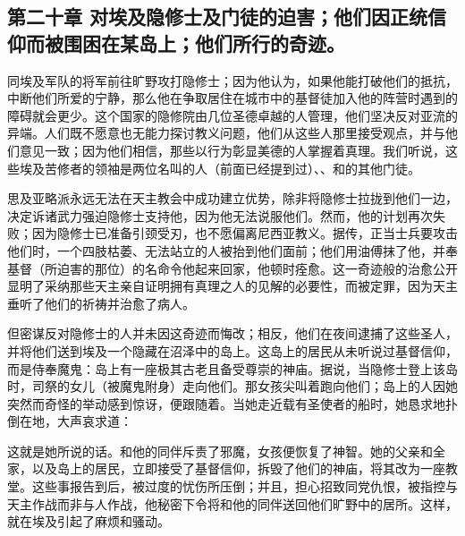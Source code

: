 \subsection{第二十章 对埃及隐修士及门徒的迫害；他们因正统信仰而被围困在某岛上；他们所行的奇迹。}

同埃及军队的将军前往旷野攻打隐修士；因为他认为，如果他能打破他们的抵抗，中断他们所爱的宁静，那么他在争取居住在城市中的基督徒加入他的阵营时遇到的障碍就会更少。这个国家的隐修院由几位圣德卓越的人管理，他们坚决反对亚流的异端。人们既不愿意也无能力探讨教义问题，他们从这些人那里接受观点，并与他们意见一致；因为他们相信，那些以行为彰显美德的人掌握着真理。我们听说，这些埃及苦修者的领袖是两位名叫的人（前面已经提到过）、、和的其他门徒。\par

思及亚略派永远无法在天主教会中成功建立优势，除非将隐修士拉拢到他们一边，决定诉诸武力强迫隐修士支持他，因为他无法说服他们。然而，他的计划再次失败；因为隐修士已准备引颈受刃，也不愿偏离尼西亚教义。据传，正当士兵要攻击他们时，一个四肢枯萎、无法站立的人被抬到他们面前；他们用油傅抹了他，并奉基督（所迫害的那位）的名命令他起来回家，他顿时痊愈。这一奇迹般的治愈公开显明了采纳那些天主亲自证明拥有真理之人的见解的必要性，而被定罪，因为天主垂听了他们的祈祷并治愈了病人。\par

但密谋反对隐修士的人并未因这奇迹而悔改；相反，他们在夜间逮捕了这些圣人，并将他们送到埃及一个隐藏在沼泽中的岛上。这岛上的居民从未听说过基督信仰，而是侍奉魔鬼：岛上有一座极其古老且备受尊崇的神庙。据说，当隐修士登上该岛时，司祭的女儿（被魔鬼附身）走向他们。那女孩尖叫着跑向他们；岛上的人因她突然而奇怪的举动感到惊讶，便跟随着。当她走近载有圣使者的船时，她恳求地扑倒在地，大声哀求道：\par

这就是她所说的话。和他的同伴斥责了邪魔，女孩便恢复了神智。她的父亲和全家，以及岛上的居民，立即接受了基督信仰，拆毁了他们的神庙，将其改为一座教堂。这些事报告到后，被过度的忧伤所压倒；并且，担心招致同党仇恨，被指控与天主作战而非与人作战，他秘密下令将和他的同伴送回他们旷野中的居所。这样，就在埃及引起了麻烦和骚动。\par

